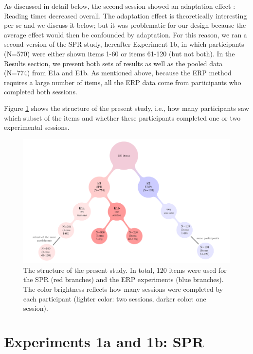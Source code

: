 \documentclass[a4paper, man, floatsintext]{apa7}
\begin{document}
As discussed in detail below, the second session showed an adaptation effect \parencite{prasad2021rapid}: Reading times decreased overall. The adaptation effect is theoretically interesting per se \parencite{fine2013rapid} and we discuss it below; but it was problematic for our design because the average effect would then be confounded by adaptation. For this reason, we ran a second version of the SPR study, hereafter Experiment 1b, in which participants (N=570) were either shown items 1-60 or items 61-120 (but not both). In the Results section, we present both sets of results as well as the pooled data (N=774) from E1a and E1b.
As mentioned above, because the ERP method requires a large number of items, all the ERP data come from participants who completed both sessions. 

Figure \ref{fig:project_str} shows the structure of the present study, i.e., how many participants saw which subset of the items and whether these participants completed one or two experimental sessions.

\begin{figure}[H]
    \caption{The structure of the present study. In total, 120 items were used for the SPR (red branches) and the ERP experiments (blue branches). The color brightness reflects how many sessions were completed by each participant (lighter color: two sessions, darker color: one session).}
    \label{fig:project_str}
    \centering
    \includegraphics[width=\textwidth]{images/pandora_project_structure_figure.pdf}
\end{figure}


\section{Experiments 1a and 1b: SPR}
\end{document}
